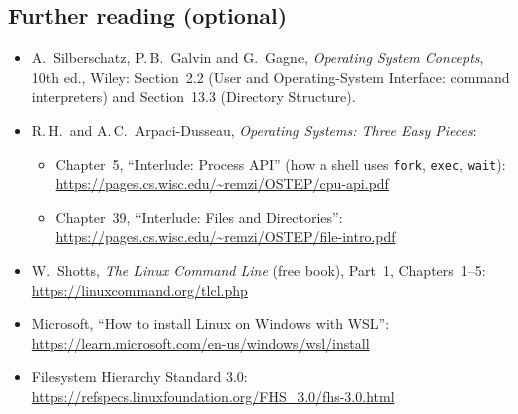 \documentclass[11pt,a4paper]{article}
\newcommand{\cmd}[1]{\texttt{#1}}
\begin{document}
\subsection*{Further reading (optional)}
\begin{itemize}
  \item A.\ Silberschatz, P.\,B.\ Galvin and G.\ Gagne, \emph{Operating System Concepts}, 10th ed., Wiley: Section~2.2 (User and Operating-System Interface: command interpreters) and Section~13.3 (Directory Structure).
  \item R.\,H.\ and A.\,C.\ Arpaci-Dusseau, \emph{Operating Systems: Three Easy Pieces}:
  \begin{itemize}
    \item Chapter~5, ``Interlude: Process API'' (how a shell uses \cmd{fork}, \cmd{exec}, \cmd{wait}): \url{https://pages.cs.wisc.edu/~remzi/OSTEP/cpu-api.pdf}
    \item Chapter~39, ``Interlude: Files and Directories'': \url{https://pages.cs.wisc.edu/~remzi/OSTEP/file-intro.pdf}
  \end{itemize}
  \item W.\ Shotts, \emph{The Linux Command Line} (free book), Part~1, Chapters~1--5: \url{https://linuxcommand.org/tlcl.php}
  \item Microsoft, ``How to install Linux on Windows with WSL'': \url{https://learn.microsoft.com/en-us/windows/wsl/install}
  \item Filesystem Hierarchy Standard 3.0: \url{https://refspecs.linuxfoundation.org/FHS_3.0/fhs-3.0.html}
\end{itemize}
\end{document}
